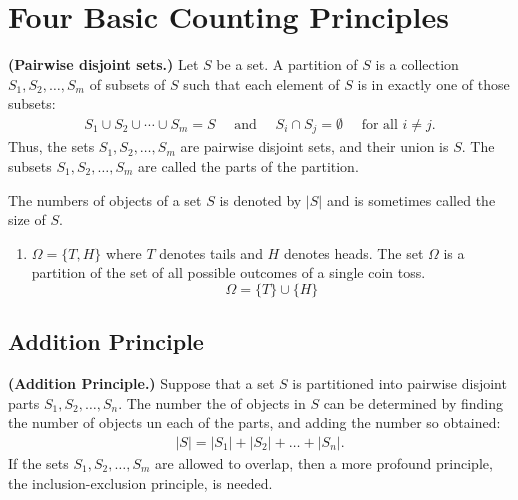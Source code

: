 \section{ Four Basic Counting Principles }
\begin{definition}{\bf (Pairwise disjoint sets.)}
    Let $S$ be a set. A partition of $S$ is a collection $S_1, S_2,\ldots, S_m$ of subsets of $S$ such that each element of $S$
    is in exactly one of those subsets:
    \begin{align*}
        S_1\cup S_2\cup \cdots \cup S_m = S \quad \text{ and } \quad S_i\cap S_j = \emptyset \quad \text{ for all } i\not=j.
    \end{align*}
    Thus, the sets $S_1,S_2,\ldots,S_m$ are pairwise disjoint sets, and their union is $S$. The subsets $S_1,S_2,\ldots,S_m$ are called the parts of the partition.

    The numbers of objects of a set $S$ is denoted by $|S|$ and is sometimes called the size of $S$.
\end{definition}
\begin{example}
    \hspace{0mm}
    \begin{enumerate}
        \item $\Omega = \{ T, H \}$ where $T$ denotes tails and $H$ denotes heads. The set $\Omega$ is a partition of the set of all possible outcomes of a single coin toss.
              $$\Omega = \{T\} \cup \{H\} $$
    \end{enumerate}
\end{example}

\subsection{Addition Principle}

\begin{definition}{\bf (Addition Principle.)}
    Suppose that a set $S$ is partitioned into pairwise disjoint parts $S_1, S_2, \ldots , S_n$. The number the
    of objects in $S$ can be determined by finding the number of objects un each of the parts, and adding the
    number so obtained:
    \begin{align}
        |S| = |S_1| + |S_2| + \ldots + |S_n|.
    \end{align}
    If the sets $S_1,S_2,\ldots,S_m$ are allowed to overlap, then a more profound principle, the inclusion-exclusion principle, is needed.
\end{definition}

